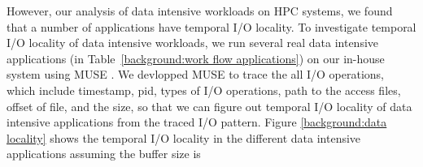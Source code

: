However, our analysis of data intensive workloads on HPC systems, we found that
a number of applications have temporal I/O locality.
To investigate temporal
I/O locality of data intensive workloads,  we run several real data intensive
applications (in Table~\ref{background:work flow applications}) on our in-house
system using MUSE \cite{MUSE}. We devlopped MUSE to trace the all I/O
operations, which include timestamp, pid, types of I/O operations, path to the access
files, offset of file, and the size, so that we can figure out temporal I/O locality of
 data intensive applications from the traced I/O pattern.
Figure \ref{background:data locality} shows the temporal I/O locality in
the different data intensive applications assuming the buffer size is
